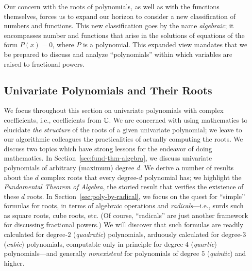 \bigskip

  
Our concern with the roots of polynomials, as well as with the functions themselves, forces us to expand our horizon to consider a new classification of numbers and functions.  This new classification goes by the name {\it algebraic}; it encompasses number and functions that arise in the solutions of equations of the form $P(x) = 0$, where $P$ is a polynomial.  This expanded view mandates that we be prepared to discuss and analyze ``polynomials'' within which variables are raised to fractional powers.


\subsection{Univariate Polynomials and Their Roots}
\label{sec:univariate-polynomials}

  
 
 

We focus throughout this section on univariate polynomials with complex coefficients, i.e., coefficients from $\mathbb{C}$.  We are concerned with using mathematics to elucidate {\em the structure} of the roots of a given univariate polynomial; we leave to our algorithmic colleagues the practicalities of actually computing the roots.  We discuss two topics which have strong lessons for the endeavor of doing mathematics.  In Section~\ref{sec:fund-thm-algebra}, we discuss univariate polynomials of arbitrary (maximum) degree $d$.  We derive a number of results about the $d$ complex roots that every degree-$d$ polynomial has; we highlight the {\it Fundamental Theorem of Algebra}, the storied result that verifies the existence of these $d$ roots.  In Section~\ref{sec:poly-by-radical}, we focus on the quest for ``simple'' formulas for roots, in terms of algebraic operations and {\it radicals}---i.e., surds such as square roots, cube roots, etc.  (Of course, ``radicals'' are just another framework for discussing fractional powers.)  We will discover that such formulas are readily calculated for degree-$2$ ({\it quadratic}) polynomials, arduously calculated for degree-$3$ ({\it cubic}) polynomials, computable only in principle for degree-$4$ ({\it quartic}) polynomials---and generally {\em nonexistent} for polynomials of degree $5$ ({\it quintic}) and higher.

